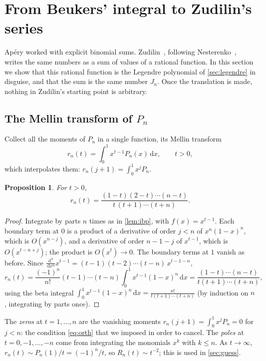 \documentclass[11pt]{article}
\newcommand{\dd}{\,\mathrm{d}}
\theoremstyle{plain}
\newtheorem{proposition}[theorem]{Proposition}
\theoremstyle{definition}
\theoremstyle{remark}
\begin{document}
\section{From Beukers' integral to Zudilin's series}\label{sec:zudilin}

Ap\'ery worked with explicit binomial sums. Zudilin~\cite{zudilin}, following
Nesterenko~\cite{nesterenko}, writes the same numbers as a sum of values of a rational function. In this section we show that
this rational function is the Legendre polynomial of \cref{sec:legendre} in disguise, and that the
sum is the same number $J_n$. Once the translation is made, nothing in Zudilin's starting point is
arbitrary.

\subsection{The Mellin transform of \texorpdfstring{$P_n$}{P\_n}}

Collect all the moments of $P_n$ in a single function, its Mellin transform
\[
  r_n(t)=\int_0^1x^{t-1}P_n(x)\dd x,\qquad t>0 ,
\]
which interpolates them: $r_n(j+1)=\int_0^1x^jP_n$.

\begin{proposition}\label{prop:mellin}
For $t>0$,
\[
  r_n(t)=\frac{(1-t)(2-t)\cdots(n-t)}{t\,(t+1)\cdots(t+n)} .
\]
\end{proposition}

\begin{proof}
Integrate by parts $n$ times as in \cref{lem:ibp}, with $f(x)=x^{t-1}$. Each boundary term at $0$ is
a product of a derivative of order $j<n$ of $x^n(1-x)^n$, which is $O(x^{n-j})$, and a derivative of
order $n-1-j$ of $x^{t-1}$, which is $O(x^{t-n+j})$; the product is $O(x^t)\to0$. The boundary terms
at $1$ vanish as before. Since $\frac{\dd^n}{\dd x^n}x^{t-1}=(t-1)(t-2)\cdots(t-n)\,x^{t-1-n}$,
\[
  r_n(t)=\frac{(-1)^n}{n!}(t-1)\cdots(t-n)\int_0^1x^{t-1}(1-x)^n\dd x
  =\frac{(1-t)\cdots(n-t)}{t(t+1)\cdots(t+n)},
\]
using the beta integral $\int_0^1x^{t-1}(1-x)^n\dd x=\frac{n!}{t(t+1)\cdots(t+n)}$ (by induction on
$n$, integrating by parts once).
\end{proof}

The \emph{zeros} at $t=1,\dots,n$ are the
vanishing moments $r_n(j+1)=\int_0^1x^jP_n=0$ for $j<n$: the condition \eqref{eq:orth} that we
imposed in order to cancel. The \emph{poles} at $t=0,-1,\dots,-n$ come from integrating the
monomials $x^k$ with $k\le n$. As $t\to\infty$, $r_n(t)\sim P_n(1)/t=(-1)^n/t$, so $R_n(t)\sim t^{-2}$;
this is used in \cref{sec:guess}.
\end{document}
